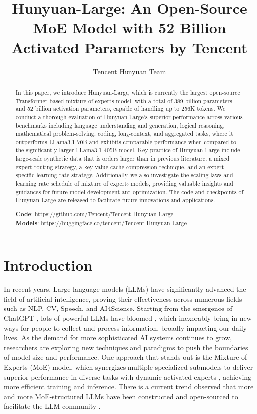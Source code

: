 \documentclass{article}
\title{Hunyuan-Large: An Open-Source MoE Model with 52 Billion Activated Parameters by Tencent}
\author{
}
\author{\hyperref[sec:contributors]{Tencent Hunyuan Team}}
\begin{document}
\maketitle
\begin{abstract}
In this paper, we introduce Hunyuan-Large, which is currently the largest open-source Transformer-based mixture of experts model, with a total of 389 billion parameters and 52 billion activation parameters, capable of handling up to 256K tokens. 
We conduct a thorough evaluation of Hunyuan-Large's superior performance across various benchmarks including language understanding and generation, logical reasoning, mathematical problem-solving, coding, long-context, and aggregated tasks, where it outperforms LLama3.1-70B and exhibits comparable performance when compared to the significantly larger LLama3.1-405B model. 
Key practice of Hunyuan-Large include large-scale synthetic data that is orders larger than in previous literature, a mixed expert routing strategy, a key-value cache compression technique, and an expert-specific learning rate strategy. 
Additionally, we also investigate the scaling laws and learning rate schedule of mixture of experts models, providing valuable insights and guidances for future model development and optimization. 
The code and checkpoints of Hunyuan-Large are released to facilitate future innovations and applications. 

\textbf{Code}: \href{https://github.com/Tencent/Hunyuan-Large}{https://github.com/Tencent/Tencent-Hunyuan-Large} \\
\textbf{Models}: \href{https://huggingface.co/tencent/Tencent-Hunyuan-Large}{https://huggingface.co/tencent/Tencent-Hunyuan-Large}
\end{abstract}

\section{Introduction}
In recent years, Large language models (LLMs) have significantly advanced the field of artificial intelligence, proving their effectiveness across numerous fields such as NLP, CV, Speech, and AI4Science. Starting from the emergence of ChatGPT \citep{OpenAI2022ChatGPT}, lots of powerful LLMs have bloomed \citep{achiam2023gpt,Gemini2023gemini,touvron2023llama,OpenAI2024GPT4o,dubey2024llama,QWen2024qwen2-5}, which inexorably bring in new ways for people to collect and process information, broadly impacting our daily lives. As the demand for more sophisticated AI systems continues to grow, researchers are exploring new techniques and paradigms to push the boundaries of model size and performance. One approach that stands out is the Mixture of Experts (MoE) model, which synergizes multiple specialized submodels to deliver superior performance in diverse tasks with dynamic activated experts \citep{lepikhin2020gshard,fedus2022switch,wang2024hmoe}, 
achieving more efficient training and inference. There is a current trend observed that more and more MoE-structured LLMs have been constructed and open-sourced to facilitate the LLM community \citep{mistral2024mixtral8x22,deepseek2024v2,yang2024qwen2,team2024jamba}.
\end{document}
